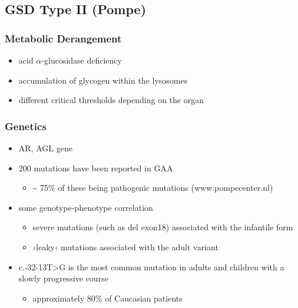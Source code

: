 \documentclass{scrartcl}
\begin{document}
\subsection{GSD Type II (Pompe)}
\label{sec:orgffbd554}
\subsubsection{Metabolic Derangement}
\label{sec:org828b37c}
\begin{itemize}
\item acid \(\alpha\)-glucosidase deficiency
\item accumulation of glycogen within the lysosomes
\item different critical thresholds depending on the organ
\end{itemize}
\subsubsection{Genetics}
\label{sec:org4b7fd3e}
\begin{itemize}
\item AR, AGL gene
\item 200 mutations have been reported in GAA
\begin{itemize}
\item \textasciitilde{} 75\% of these being pathogenic mutations (www.pompecenter.nl)
\end{itemize}
\item some genotype-phenotype correlation
\begin{itemize}
\item severe mutations (such as del exon18) associated with the infantile form
\item ›leaky‹ mutations associated with the adult variant
\end{itemize}
\item c.-32-13T>G is the most common mutation in adults and children with
a slowly progressive course
\begin{itemize}
\item approximately 80\% of Caucasian patients
\end{itemize}
\end{itemize}
\end{document}
